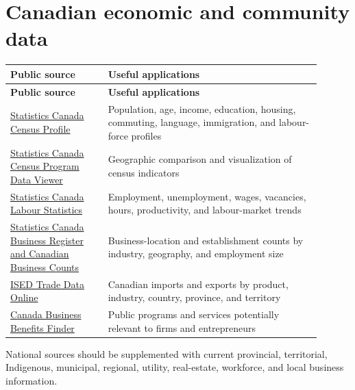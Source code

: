 \documentclass[11pt,letterpaper,oneside,openany]{book}
\begin{document}
\section[Canadian economic and community data]{Canadian economic and community data}
\begin{center}
\small
\setlength{\LTpre}{0.4em}
\setlength{\LTpost}{0.8em}
\begin{longtable}{>{\RaggedRight\arraybackslash}p{0.290\linewidth}>{\RaggedRight\arraybackslash}p{0.610\linewidth}}
\rowcolor{DeepNavy}
\color{white}\bfseries Public source & \color{white}\bfseries Useful applications \\
\endfirsthead
\rowcolor{DeepNavy}
\color{white}\bfseries Public source & \color{white}\bfseries Useful applications \\
\endhead
\href{https://www12.statcan.gc.ca/census-recensement/2021/dp-pd/prof/index.cfm?Lang=E}{Statistics Canada Census Profile} & Population, age, income, education, housing, commuting, language, immigration, and labour-force profiles \\
\href{https://www12.statcan.gc.ca/census-recensement/2021/dp-pd/dv-vd/cpdv-vdpr/cpdv-vdpr-eng.cfm}{Statistics Canada Census Program Data Viewer} & Geographic comparison and visualization of census indicators \\
\href{https://www.statcan.gc.ca/en/subjects-start/labour\_}{Statistics Canada Labour Statistics} & Employment, unemployment, wages, vacancies, hours, productivity, and labour-market trends \\
\href{https://www23.statcan.gc.ca/imdb-bmdi/pub/1105-eng.htm}{Statistics Canada Business Register and Canadian Business Counts} & Business-location and establishment counts by industry, geography, and employment size \\
\href{https://ised-isde.canada.ca/site/trade-data-online/en}{ISED Trade Data Online} & Canadian imports and exports by product, industry, country, province, and territory \\
\href{https://innovation.ised-isde.canada.ca/s/?language=en\_CA}{Canada Business Benefits Finder} & Public programs and services potentially relevant to firms and entrepreneurs \\
\end{longtable}
\end{center}
National sources should be supplemented with current provincial, territorial, Indigenous, municipal, regional, utility, real-estate, workforce, and local business information.
\end{document}
